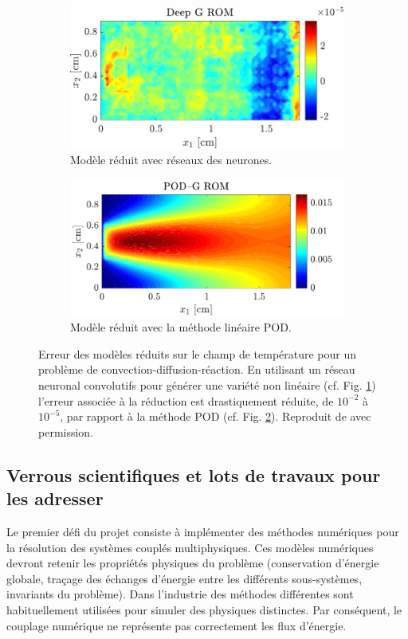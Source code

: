 \documentclass[12pt, french]{article}
\begin{document}
	\begin{figure}[t]
		\begin{subfigure}[t]{0.465\textwidth}
			\includegraphics[width=\columnwidth]{DGROM_T_param1.pdf} 
			\caption{Modèle réduit avec réseaux des neurones.}
			\label{fig:DG_ROM}
		\end{subfigure}\hfill
		\begin{subfigure}[t]{0.48\textwidth}
			\includegraphics[width=\columnwidth]{GROM_T_param1.pdf}%
			\caption{Modèle réduit avec la méthode linéaire POD.}
			\label{fig:POD_ROM}
		\end{subfigure}
		\caption[]{Erreur des modèles réduits sur le champ de température pour un problème de convection-diffusion-réaction. En utilisant un réseau neuronal convolutifs pour générer une variété non linéaire (cf. Fig. \ref{fig:DG_ROM}) l'erreur associée à la réduction  est drastiquement réduite, de $10^{-2}$ à $10^{-5}$, par rapport à la méthode POD (cf. Fig. \ref{fig:POD_ROM}). Reproduit de \cite{lee2020} avec permission.}%
		\label{fig:deepROM}%
	\end{figure}


\subsection{Verrous scientifiques et lots de travaux pour les adresser}
Le premier défi du projet consiste à implémenter des méthodes numériques pour la résolution des systèmes couplés multiphysiques. Ces modèles numériques devront retenir les propriétés physiques du problème (conservation d’énergie globale, traçage des échanges d’énergie entre les différents sous-systèmes, invariants du problème). Dans l'industrie des méthodes différentes sont habituellement utilisées pour simuler des physiques distinctes. Par conséquent, le couplage numérique ne représente pas correctement les flux d’énergie. \\
\end{document}
